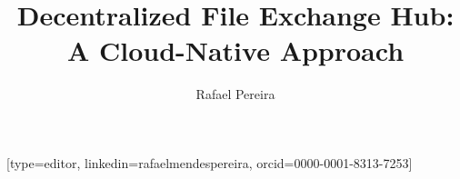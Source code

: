 \documentclass[a4paper,fleqn]{cas-sc}
\begin{document}
\let\WriteBookmarks\relax
\def\floatpagepagefraction{1}
\def\textpagefraction{.001}


\title [mode = title]{Decentralized File Exchange Hub: A Cloud-Native Approach}                     


\author[1]{Rafael Pereira}[type=editor,
                        linkedin=rafaelmendespereira,
                        orcid=0000-0001-8313-7253]
   
\address[1]{Computer Science and Communications Research Centre, School of Technology and Management, Polytechnic of Leiria, 2411-901 Leiria, Portugal}
\end{document}
